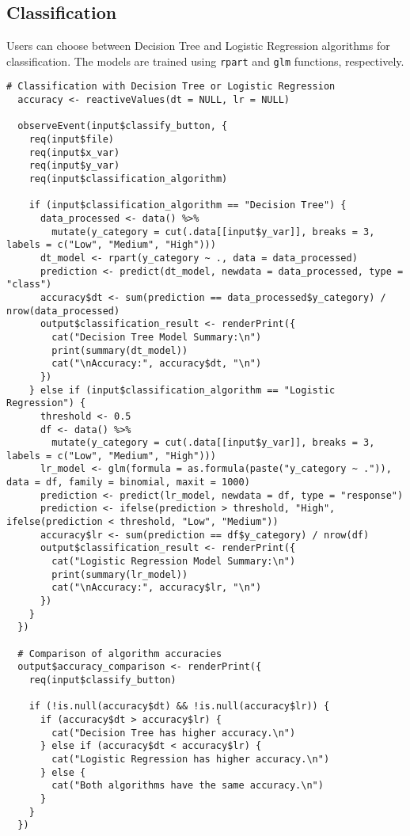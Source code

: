 \documentclass{article}
\begin{document}
\subsection{Classification}
Users can choose between Decision Tree and Logistic Regression algorithms for classification. The models are trained using \texttt{rpart} and \texttt{glm} functions, respectively.

\begin{verbatim}
# Classification with Decision Tree or Logistic Regression
  accuracy <- reactiveValues(dt = NULL, lr = NULL)
  
  observeEvent(input$classify_button, {
    req(input$file)
    req(input$x_var)
    req(input$y_var)
    req(input$classification_algorithm)
    
    if (input$classification_algorithm == "Decision Tree") {
      data_processed <- data() %>%
        mutate(y_category = cut(.data[[input$y_var]], breaks = 3, labels = c("Low", "Medium", "High")))
      dt_model <- rpart(y_category ~ ., data = data_processed)
      prediction <- predict(dt_model, newdata = data_processed, type = "class")
      accuracy$dt <- sum(prediction == data_processed$y_category) / nrow(data_processed)
      output$classification_result <- renderPrint({
        cat("Decision Tree Model Summary:\n")
        print(summary(dt_model))
        cat("\nAccuracy:", accuracy$dt, "\n")
      })
    } else if (input$classification_algorithm == "Logistic Regression") {
      threshold <- 0.5
      df <- data() %>%
        mutate(y_category = cut(.data[[input$y_var]], breaks = 3, labels = c("Low", "Medium", "High")))
      lr_model <- glm(formula = as.formula(paste("y_category ~ .")), data = df, family = binomial, maxit = 1000)
      prediction <- predict(lr_model, newdata = df, type = "response")
      prediction <- ifelse(prediction > threshold, "High", ifelse(prediction < threshold, "Low", "Medium"))
      accuracy$lr <- sum(prediction == df$y_category) / nrow(df)
      output$classification_result <- renderPrint({
        cat("Logistic Regression Model Summary:\n")
        print(summary(lr_model))
        cat("\nAccuracy:", accuracy$lr, "\n")
      })
    }
  })
  
  # Comparison of algorithm accuracies
  output$accuracy_comparison <- renderPrint({
    req(input$classify_button)
    
    if (!is.null(accuracy$dt) && !is.null(accuracy$lr)) {
      if (accuracy$dt > accuracy$lr) {
        cat("Decision Tree has higher accuracy.\n")
      } else if (accuracy$dt < accuracy$lr) {
        cat("Logistic Regression has higher accuracy.\n")
      } else {
        cat("Both algorithms have the same accuracy.\n")
      }
    }
  })
\end{verbatim}
\end{document}
